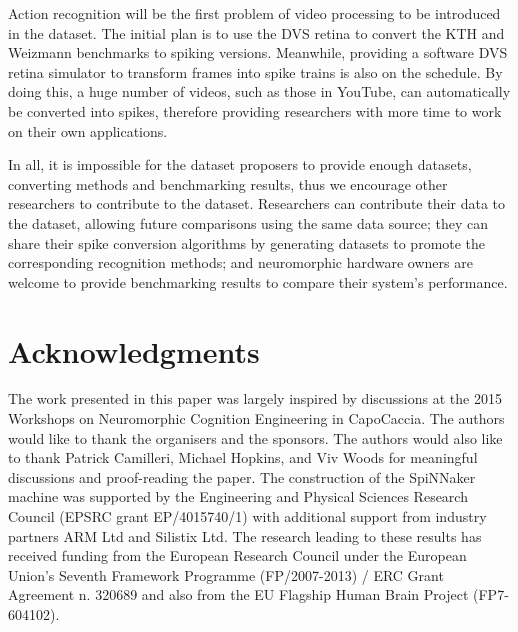 \documentclass{frontiersENG} %
\begin{document}
Action recognition will be the first problem of video processing to be introduced in the dataset.
The initial plan is to use the DVS retina to convert the KTH and Weizmann benchmarks to spiking versions.
Meanwhile, providing a software DVS retina simulator to transform frames into spike trains is also on the schedule.
By doing this, a huge number of videos, such as those in YouTube, can automatically be converted into spikes, therefore providing researchers with more time to work on their own applications.

In all, it is impossible for the dataset proposers to provide enough datasets, converting methods and benchmarking results, thus we encourage other researchers to contribute to the dataset.
Researchers can contribute their data to the dataset, allowing future comparisons using the same data source;
they can share their spike conversion algorithms by generating datasets to promote the corresponding recognition methods;
and neuromorphic hardware owners are welcome to provide benchmarking results to compare their system's performance.

\section*{Acknowledgments}

The work presented in this paper was largely inspired by discussions at the 2015 Workshops on Neuromorphic Cognition Engineering in CapoCaccia.
The authors would like to thank the organisers and the sponsors.
The authors would also like to thank Patrick Camilleri, Michael Hopkins, and Viv Woods for meaningful discussions and proof-reading the paper.
The construction of the SpiNNaker machine was supported by the Engineering and Physical Sciences Research Council (EPSRC grant EP/4015740/1) with additional support from industry partners ARM Ltd and Silistix Ltd.
The research leading to these results has received funding from the European Research Council under the European Union's Seventh Framework Programme (FP/2007-2013) / ERC Grant Agreement n. 320689 and also from the EU Flagship Human Brain Project (FP7-604102). 



%
\end{document}
